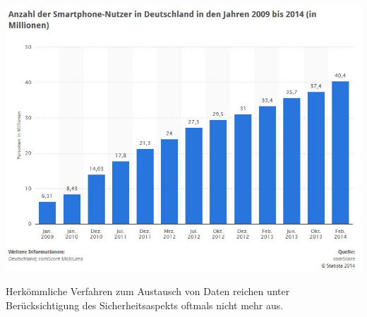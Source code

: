 \documentclass[10pt, a4paper,headsepline]{scrreprt}
\begin{document}
\begin{center}
\includegraphics[scale=0.6]{smartphoneUser_Germany.JPG} 

\end{center}
Herkömmliche Verfahren zum Austausch von Daten reichen unter Berücksichtigung des Sicherheitsaspekts oftmals nicht mehr aus.
\end{document}
